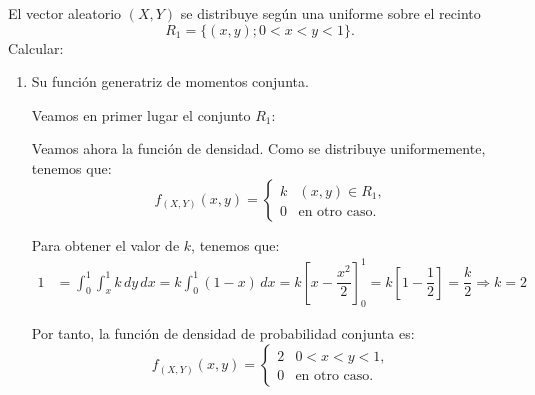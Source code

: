 \begin{ejercicio}
    El vector aleatorio $(X,Y)$ se distribuye según una uniforme sobre el recinto
    \begin{equation*}
        R_1 = \{(x, y); 0<x<y<1\}.
    \end{equation*}
    Calcular:
    \begin{enumerate}
        \item Su función generatriz de momentos conjunta.
        
        Veamos en primer lugar el conjunto $R_1$:
        \begin{figure}[H]
            \centering
        \end{figure}

        Veamos ahora la función de densidad. Como se distribuye uniformemente, tenemos que:
        \begin{equation*}
            f_{(X,Y)}(x,y)=\begin{cases}
                k & (x,y)\in R_1, \\
                0 & \text{en otro caso}.
            \end{cases}
        \end{equation*}

        Para obtener el valor de $k$, tenemos que:
        \begin{align*}
            1&=\int_{0}^{1}\int_{x}^{1} k \, dy \, dx
            = k\int_{0}^{1}(1-x) \, dx
            = k\left[x-\dfrac{x^2}{2}\right]_{0}^{1}
            = k\left[1-\dfrac{1}{2}\right]
            = \dfrac{k}{2}
            \Longrightarrow k=2
        \end{align*}

        Por tanto, la función de densidad de probabilidad conjunta es:
        \begin{equation*}
            f_{(X,Y)}(x,y)=\begin{cases}
                2 & 0<x<y<1, \\
                0 & \text{en otro caso}.
            \end{cases}
        \end{equation*}


\end{enumerate}
\end{ejercicio}
